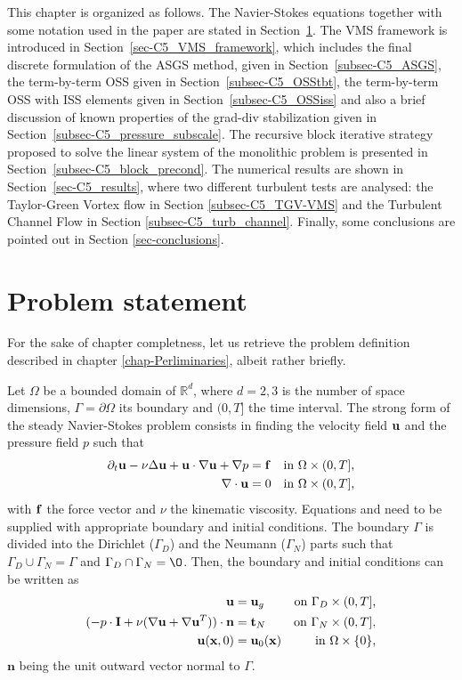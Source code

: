 This chapter is organized as follows. The Navier-Stokes equations together with some notation used in the paper are stated in Section~\ref{sec-C5_prob_statement}. The VMS framework is introduced in Section~\ref{sec-C5_VMS_framework}, which includes the final discrete formulation of the ASGS method, given in Section~\ref{subsec-C5_ASGS}, the term-by-term OSS given in Section~\ref{subsec-C5_OSStbt}, the term-by-term OSS with ISS elements given in Section~\ref{subsec-C5_OSSiss} and also a brief discussion of known properties of the grad-div stabilization given in Section~\ref{subsec-C5_pressure_subscale}. The recursive block iterative strategy proposed to solve the linear system of the monolithic problem is presented in Section~\ref{subsec-C5_block_precond}. The numerical results are shown in Section~\ref{sec-C5_results}, where two different turbulent tests are analysed: the Taylor-Green Vortex flow in Section \ref{subsec-C5_TGV-VMS} and the Turbulent Channel Flow in Section \ref{subsec-C5_turb_channel}. Finally, some conclusions are pointed out in Section \ref{sec-conclusions}.

\section{Problem statement}
\label{sec-C5_prob_statement}
For the sake of chapter completness, let us retrieve the problem definition described in chapter \ref{chap-Perliminaries}, albeit rather briefly.

Let $\Omega$ be a bounded domain of $\mathbb{R}^d$, where $d=2,3$ is the number of space dimensions, $\Gamma=\partial\Omega$ its boundary and $(0,T]$ the time interval. The strong form of the steady Navier-Stokes problem consists in finding the velocity field ${\bf u}$ and the pressure field $p$ such that 
\begin{align}
\label{eq-C5_NS_strong_mome}
\partial_t{\bf u}-\nu\Delta{\bf u}+{\bf u}\cdot\nabla{\bf u}+\nabla p&={\bf f}&\mbox{in $\Omega\times(0,T]$,}\\
\label{eq-C5_NS_strong_inc}
\nabla\cdot{\bf u}&=0&\mbox{in $\Omega\times(0,T]$,}
\end{align}
with ${\bf f}$ the force vector and $\nu$ the kinematic viscosity. Equations  and  need to be supplied with appropriate boundary and initial conditions. The boundary $\Gamma$ is divided into the Dirichlet ($\Gamma_D$) and the Neumann ($\Gamma_N$) parts such that $\Gamma_D\cup\Gamma_N=\Gamma$ and $\Gamma_D\cap\Gamma_N=\O$. Then, the boundary and initial conditions can be written as
\begin{align}
\label{eq-C5_NS_strong_Dir}
{\bf u}&={\bf u}_g&\mbox{on $\Gamma_D\times(0,T]$,}\\
\label{eq-C5_NS_strong_Neu}
(-p\cdot\mathbf{I}+\nu(\nabla{\bf u}+\nabla{\bf u}^T))\cdot\mathbf{n}&=\mathbf{t}_N&\mbox{on $\Gamma_N\times(0,T]$,}\\
\label{eq-C5_NS_strong_Ini}
{\bf u}({\bf x},0)&={\bf u}_0({\bf x})&\mbox{in $\Omega\times\{0\}$,}
\end{align}
$\mathbf{n}$ being the unit outward vector normal to $\Gamma$.

